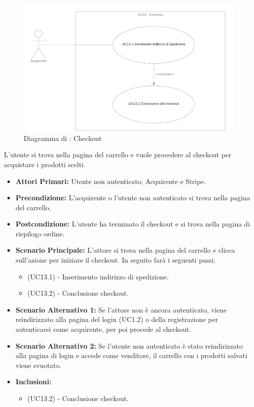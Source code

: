 \begin{figure}[H]
    \centering
    \includegraphics[scale=0.4]{Immagini/DiagrammiUC/UC13Checkout.png}
    \caption{Diagramma di \actualUC: Checkout} 
    \label{fig:Checkout}
\end{figure}

L'utente si trova nella pagina del carrello e vuole procedere al checkout per acquistare i prodotti scelti.
\begin{itemize}
    \item \textbf{Attori Primari:} Utente non autenticato; Acquirente e Stripe.
    \item \textbf{Precondizione:} L'acquirente o l'utente non autenticato si trova nella pagina del carrello.
    \item \textbf{Postcondizione:} L'utente ha terminato il checkout e si trova nella pagina di riepilogo ordine.
    \item \textbf{Scenario Principale:} L'attore si trova nella pagina del carrello e clicca sull'azione per iniziare il checkout. In seguito farà i seguenti passi:
    \begin{itemize}
        \item (UC13.1) - Inserimento indirizzo di spedizione.
        \item (UC13.2) - Conclusione checkout.
    \end{itemize}
    \item \textbf{Scenario Alternativo 1:} Se l'attore non è ancora autenticato, viene reindirizzato alla pagina del login (UC1.2) o della registrazione per autenticarsi come acquirente, per poi procede al checkout.
    \item \textbf{Scenario Alternativo 2:} Se l'utente non autenticato è stato reindirizzato alla pagina di login e accede come venditore, il carrello con i prodotti salvati viene svuotato.
    \item \textbf{Inclusioni:}
    \begin{itemize}
        \item (UC13.2) - Conclusione checkout.
    \end{itemize}
\end{itemize}

